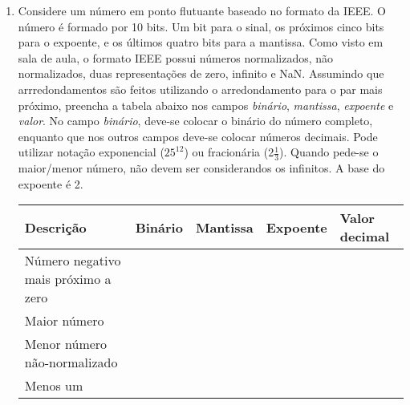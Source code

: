 \begin{enumerate}
    \item
    Considere um número em ponto flutuante baseado no formato da IEEE.
    O número é formado por 10 bits. 
    Um bit para o sinal, 
    os próximos cinco bits para o expoente,
    e os últimos quatro bits para a mantissa.
    Como visto em sala de aula, o formato IEEE possui números normalizados,
    não normalizados, duas representações de zero, infinito e NaN.
    Assumindo que arrredondamentos são feitos utilizando
    o arredondamento para o par mais próximo,
    preencha a tabela abaixo nos campos 
    \textit{binário}, \textit{mantissa}, \textit{expoente} e \textit{valor}.
    No campo \textit{binário}, deve-se colocar o binário do número completo,
    enquanto que nos outros campos deve-se colocar números decimais.
    Pode utilizar notação exponencial ($25^{12}$) ou fracionária (2$\frac{1}{3}$).
    Quando pede-se o maior/menor número, não devem ser considerandos os infinitos.
    A base do expoente é 2.

    \begin{table}[H]
        \begin{tabular}{|l|l|l|l|l|}
            \hline
            \textbf{Descrição}  & 
            \textbf{Binário}    & 
            \textbf{Mantissa}   &
            \textbf{Expoente}   &
            \textbf{Valor decimal} \\\hline
            Número negativo mais próximo a zero & & & & \\\hline
            Maior número & & & & \\\hline
            Menor número não-normalizado & & & & \\\hline
            Menos um & & & & \\
            \hline
        \end{tabular}
    \end{table}

\end{enumerate}
